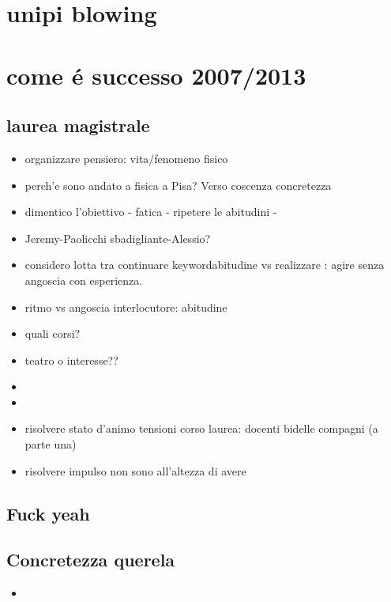 \section{unipi blowing}

\section{come \'e successo 2007/2013}

\subsection{laurea magistrale}

\begin{itemize}
\item organizzare pensiero: vita/fenomeno fisico
\item perch'e sono andato a fisica a Pisa? Verso coscenza concretezza
\item dimentico l'obiettivo - fatica - ripetere le abitudini - 
\item Jeremy-Paolicchi sbadigliante-Alessio?
\item considero lotta tra continuare keyword{abitudine} vs realizzare : agire senza angoscia con esperienza.
\item ritmo vs angoscia interlocutore: abitudine 
\item quali corsi?
\item teatro  o interesse??
\item {}
\item {}
\item risolvere stato d'animo tensioni corso laurea: docenti bidelle compagni (a parte una)
\item risolvere impulso non sono all'altezza di avere 
\end{itemize}

\subsection{Fuck yeah}

\subsection{Concretezza querela}

\begin{itemize}
\item 
\end{itemize}

